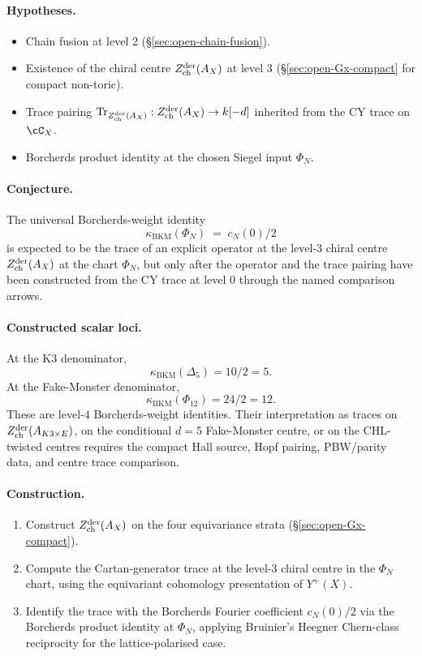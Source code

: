 \paragraph{Hypotheses.}
\begin{itemize}[nosep]
\item Chain fusion at level 2 (\S\ref{sec:open-chain-fusion}).
\item Existence of the chiral centre $Z^{\mathrm{der}}_{\mathrm{ch}}(A_X)$ at level 3
  (\S\ref{sec:open-Gx-compact} for compact non-toric).
\item Trace pairing $\mathrm{Tr}_{Z^{\mathrm{der}}_{\mathrm{ch}}(A_X)} : Z^{\mathrm{der}}_{\mathrm{ch}}(A_X) \to k[-d]$
  inherited from the CY trace on $\cC_X$.
\item Borcherds product identity at the chosen Siegel input $\Phi_N$.
\end{itemize}

\paragraph{Conjecture.} The universal
Borcherds-weight identity
\[
\kappa_{\mathrm{BKM}}(\Phi_N) \;=\; c_N(0)/2
\]
is expected to be the trace of an explicit operator at the level-3
chiral centre \(Z^{\mathrm{der}}_{\mathrm{ch}}(A_X)\) at the chart \(\Phi_N\), but only after the
operator and the trace pairing have been constructed from the CY trace
at level \(0\) through the named comparison arrows.

\paragraph{Constructed scalar loci.} At the K3 denominator,
\[
 \kappa_{\mathrm{BKM}}(\Delta_5)=10/2=5.
\]
At the Fake-Monster denominator,
\[
 \kappa_{\mathrm{BKM}}(\Phi_{12})=24/2=12.
\]
These are level-$4$ Borcherds-weight identities.  Their interpretation
as traces on \(Z^{\mathrm{der}}_{\mathrm{ch}}(A_{K3\times E})\), on the conditional \(d=5\)
Fake-Monster centre, or on the CHL-twisted centres requires the compact
Hall source, Hopf pairing, PBW/parity data, and centre trace comparison.

\paragraph{Construction.}
\begin{enumerate}[nosep]
\item Construct $Z^{\mathrm{der}}_{\mathrm{ch}}(A_X)$ on the four equivariance strata
  (\S\ref{sec:open-Gx-compact}).
\item Compute the Cartan-generator trace at the level-3 chiral centre
  in the $\Phi_N$ chart, using the equivariant cohomology presentation
  of $Y^+(X)$.
\item Identify the trace with the Borcherds Fourier coefficient
  $c_N(0)/2$ via the Borcherds product identity at $\Phi_N$, applying
  Bruinier's Heegner Chern-class reciprocity for the lattice-polarised
  case.
\end{enumerate}

